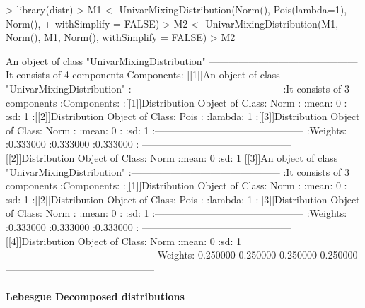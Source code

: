 \documentclass[11pt]{article}
\begin{document}
\begin{Schunk}
\begin{Sinput}
> library(distr)
> M1 <- UnivarMixingDistribution(Norm(), Pois(lambda=1), Norm(), 
+       withSimplify = FALSE)
> M2 <- UnivarMixingDistribution(M1, Norm(), M1, Norm(), withSimplify = FALSE)
> M2
\end{Sinput}
\begin{Soutput}
An object of class "UnivarMixingDistribution"
 ---------------------------------------------
 It consists of  4 components 
 Components: 
 [[1]]An object of class "UnivarMixingDistribution"
       :---------------------------------------------
       :It consists of  3 components 
       :Components: 
       :[[1]]Distribution Object of Class: Norm
       :      :mean: 0
       :      :sd: 1
       :[[2]]Distribution Object of Class: Pois
       :      :lambda: 1
       :[[3]]Distribution Object of Class: Norm
       :      :mean: 0
       :      :sd: 1
       :---------------------------------------------
       :Weights: 
       :0.333000       :0.333000       :0.333000       :
 ---------------------------------------------
 [[2]]Distribution Object of Class: Norm
       :mean: 0
       :sd: 1
 [[3]]An object of class "UnivarMixingDistribution"
       :---------------------------------------------
       :It consists of  3 components 
       :Components: 
       :[[1]]Distribution Object of Class: Norm
       :      :mean: 0
       :      :sd: 1
       :[[2]]Distribution Object of Class: Pois
       :      :lambda: 1
       :[[3]]Distribution Object of Class: Norm
       :      :mean: 0
       :      :sd: 1
       :---------------------------------------------
       :Weights: 
       :0.333000       :0.333000       :0.333000       :
 ---------------------------------------------
 [[4]]Distribution Object of Class: Norm
       :mean: 0
       :sd: 1
 ---------------------------------------------
 Weights: 
 0.250000 0.250000 0.250000 0.250000 
 ---------------------------------------------
\end{Soutput}
\end{Schunk}

\paragraph{Lebesgue Decomposed distributions}
\end{document}
